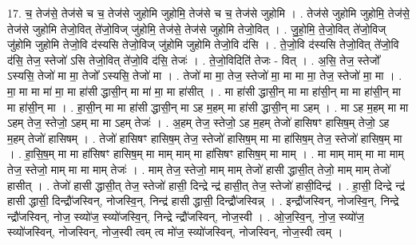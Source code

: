 \documentclass[17pt]{extarticle}
\begin{document}
17. च॒ तेज॑से॒ तेज॑से च च॒ तेज॑से जुहोमि जुहोमि॒ तेज॑से च च॒ तेज॑से जुहोमि । . तेज॑से जुहोमि जुहोमि॒ तेज॑से॒ तेज॑से जुहोमि तेजो॒वित् ते॑जो॒विज् जु॑होमि॒ तेज॑से॒ तेज॑से जुहोमि तेजो॒वित् । . जु॒हो॒मि॒ ते॒जो॒वित् ते॑जो॒विज् जु॑होमि जुहोमि तेजो॒वि द॑स्यसि तेजो॒विज् जु॑होमि जुहोमि तेजो॒वि द॑सि । . ते॒जो॒वि द॑स्यसि तेजो॒वित् ते॑जो॒वि द॑सि॒ तेज॒ स्तेजो॑ ऽसि तेजो॒वित् ते॑जो॒वि द॑सि॒ तेजः॑ । . ते॒जो॒विदिति॑ तेजः - वित् । . अ॒सि॒ तेज॒ स्तेजो᳚ ऽस्यसि॒ तेजो॑ मा मा॒ तेजो᳚ ऽस्यसि॒ तेजो॑ मा । . तेजो॑ मा मा॒ तेज॒ स्तेजो॑ मा॒ मा मा मा॒ तेज॒ स्तेजो॑ मा॒ मा । . मा॒ मा मा मा॑ मा॒ मा हा॑सी द्धासी॒न् मा मा॑ मा॒ मा हा॑सीत् । . मा हा॑सी द्धासी॒न् मा मा हा॑सी॒न् मा मा हा॑सी॒न् मा मा हा॑सी॒न् मा । . हा॒सी॒न् मा मा हा॑सी द्धासी॒न् मा ऽह म॒हम् मा हा॑सी द्धासी॒न् मा ऽहम् । . मा ऽह म॒हम् मा मा ऽहम् तेज॒ स्तेजो॒ ऽहम् मा मा ऽहम् तेजः॑ । . अ॒हम् तेज॒ स्तेजो॒ ऽह म॒हम् तेजो॑ हासिषꣳ हासिष॒म् तेजो॒ ऽह म॒हम् तेजो॑ हासिषम् । . तेजो॑ हासिषꣳ हासिष॒म् तेज॒ स्तेजो॑ हासिष॒म् मा मा हा॑सिष॒म् तेज॒ स्तेजो॑ हासिष॒म् मा । . हा॒सि॒ष॒म् मा मा हा॑सिषꣳ हासिष॒म् मा माम् माम् मा हा॑सिषꣳ हासिष॒म् मा माम् । . मा माम् माम् मा मा माम् तेज॒ स्तेजो॒ माम् मा मा माम् तेजः॑ । . माम् तेज॒ स्तेजो॒ माम् माम् तेजो॑ हासी द्धासी॒त् तेजो॒ माम् माम् तेजो॑ हासीत् । . तेजो॑ हासी द्धासी॒त् तेज॒ स्तेजो॑ हासी॒ दिन्द्रे न्द्र॑ हासी॒त् तेज॒ स्तेजो॑ हासी॒दिन्द्र॑ । . हा॒सी॒ दिन्द्रे न्द्र॑ हासी द्धासी॒ दिन्द्रौ॑जस्विन्, नोजस्वि॒न्, निन्द्र॑ हासी द्धासी॒ दिन्द्रौ॑जस्विन्न् । . इन्द्रौ॑जस्विन्, नोजस्वि॒न्, निन्द्रे न्द्रौ॑जस्विन्, नोज॒ स्व्यो॑ज॒ स्व्यो॑जस्वि॒न्, निन्द्रे न्द्रौ॑जस्विन्, नोज॒स्वी । . ओ॒ज॒स्वि॒न्, नो॒ज॒ स्व्यो॑ज॒ स्व्यो॑जस्विन्, नोजस्विन्, नोज॒स्वी त्वम् त्व मो॑ज॒ स्व्यो॑जस्विन्, नोजस्विन्, नोज॒स्वी त्वम् । \newline
\end{document}
